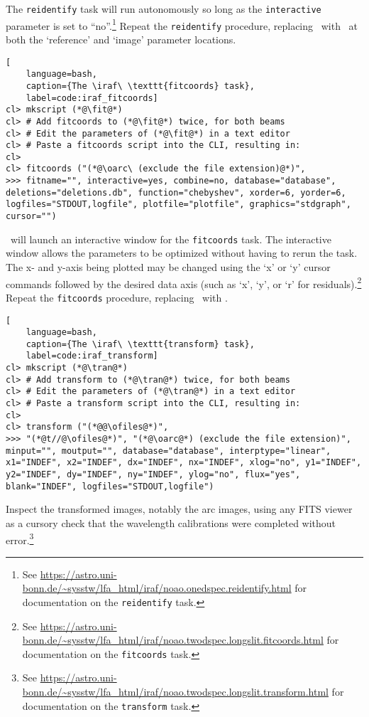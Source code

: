 The \texttt{reidentify} task will run autonomously so long as the \texttt{interactive} parameter is set to ``no''.\footnote{See \protect\url{https://astro.uni-bonn.de/~sysstw/lfa_html/iraf/noao.onedspec.reidentify.html} for documentation on the \texttt{reidentify} task.} Repeat the \texttt{reidentify} procedure, replacing \oarc\ with \earc\ at both the `reference' and `image' parameter locations.

\begin{lstlisting}[
    language=bash,
    caption={The \iraf\ \texttt{fitcoords} task},
    label=code:iraf_fitcoords]
cl> mkscript (*@\fit@*)
cl> # Add fitcoords to (*@\fit@*) twice, for both beams
cl> # Edit the parameters of (*@\fit@*) in a text editor
cl> # Paste a fitcoords script into the CLI, resulting in:
cl> 
cl> fitcoords ("(*@\oarc\ (exclude the file extension)@*)",
>>> fitname="", interactive=yes, combine=no, database="database", deletions="deletions.db", function="chebyshev", xorder=6, yorder=6, logfiles="STDOUT,logfile", plotfile="plotfile", graphics="stdgraph", cursor="")
\end{lstlisting}

\iraf\ will launch an interactive window for the \texttt{fitcoords} task. The interactive window allows the parameters to be optimized without having to rerun the task. The x- and y-axis being plotted may be changed using the `x' or `y' cursor commands followed by the desired data axis (such as `x', `y', or `r' for residuals).\footnote{See \protect\url{https://astro.uni-bonn.de/~sysstw/lfa_html/iraf/noao.twodspec.longslit.fitcoords.html} for documentation on the \texttt{fitcoords} task.} Repeat the \texttt{fitcoords} procedure, replacing \oarc\ with \earc.

\begin{lstlisting}[
    language=bash,
    caption={The \iraf\ \texttt{transform} task},
    label=code:iraf_transform]
cl> mkscript (*@\tran@*)
cl> # Add transform to (*@\tran@*) twice, for both beams
cl> # Edit the parameters of (*@\tran@*) in a text editor
cl> # Paste a transform script into the CLI, resulting in:
cl> 
cl> transform ("(*@@\ofiles@*)",
>>> "(*@t//@\ofiles@*)", "(*@\oarc@*) (exclude the file extension)", minput="", moutput="", database="database", interptype="linear", x1="INDEF", x2="INDEF", dx="INDEF", nx="INDEF", xlog="no", y1="INDEF", y2="INDEF", dy="INDEF", ny="INDEF", ylog="no", flux="yes", blank="INDEF", logfiles="STDOUT,logfile")
\end{lstlisting}

Inspect the transformed images, notably the arc images, using any \gls{FITS} viewer as a cursory check that the wavelength calibrations were completed without error.\footnote{See \protect\url{https://astro.uni-bonn.de/~sysstw/lfa_html/iraf/noao.twodspec.longslit.transform.html} for documentation on the \texttt{transform} task.}

